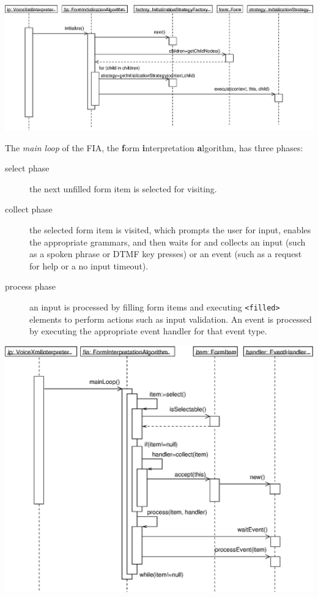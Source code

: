 \documentclass[11pt,a4paper]{article}
\begin{document}
\begin{center}
\includegraphics[scale=0.45]{seq-interpreter-fia-initialize.eps}
\end{center}

The \emph{main loop} of the FIA, the \textbf{f}orm \textbf{i}nterpretation
\textbf{a}lgorithm, has three phases:

\begin{description}
\item[select phase] the next unfilled form item is selected for visiting.
\item[collect phase] the selected form item is visited, which prompts the user
for input, enables the appropriate grammars, and then waits for and collects 
an input (such as a spoken phrase or DTMF key presses) or an event 
(such as a request for help or a no input timeout).
\item[process phase] an input is processed by filling form items and executing
\texttt{<filled>} elements to perform actions such as input validation.
An event is processed by executing the appropriate event handler for that 
event type.
\end{description}

\begin{center}
\includegraphics[scale=0.6]{seq-interpreter-fia-mainloop.eps}
\end{center}
\end{document}
